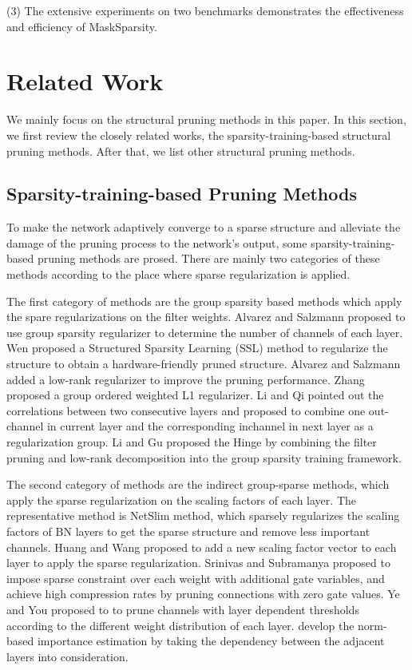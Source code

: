 \documentclass[review]{cvpr}
\begin{document}
(3)	The extensive experiments on two benchmarks demonstrates the effectiveness and efficiency of MaskSparsity.



\section{Related Work}
We mainly focus on the structural pruning methods in this paper.
In this section, we first review the closely related works, \ie the sparsity-training-based structural pruning methods. After that, we list other structural pruning methods.

\subsection{Sparsity-training-based Pruning Methods}
To make the network adaptively converge to a sparse structure and alleviate the damage of the pruning process to the network's output, some sparsity-training-based pruning methods are prosed. There are mainly two categories of these methods according to the place where sparse regularization is applied. 

The first category of methods are the group sparsity based methods which apply the spare regularizations on the filter weights. Alvarez and Salzmann \cite{alvarez2016learning} proposed to use group sparsity regularizer to determine the number of channels of each layer. Wen \etal \cite{wen2016learning} proposed a Structured Sparsity Learning (SSL) method to regularize the structure to obtain a hardware-friendly pruned structure.  Alvarez and Salzmann \cite{alvarez2017compression} added a low-rank regularizer to improve the pruning performance. Zhang \etal proposed a group ordered weighted L1 regularizer. Li and Qi \cite{OICSROS} pointed out the correlations between two consecutive layers and proposed to combine one out-channel in current layer and the corresponding inchannel in next layer as a regularization group. Li and Gu proposed the Hinge \cite{Hinge} by combining the filter pruning and low-rank decomposition into the group sparsity training framework.

 
The second category of methods are the indirect group-sparse methods, which apply the sparse regularization on the scaling factors of each layer. The representative method is NetSlim \cite{liu2017learning} method, which sparsely regularizes the scaling factors of BN layers to get the sparse structure and remove less important channels. Huang and Wang \cite{huang2018data} proposed to add a new scaling factor vector to each layer to apply the sparse regularization. Srinivas and Subramanya \cite{Srinivas2017TrainingSN} proposed to impose sparse constraint over each weight with additional gate variables, and achieve high compression rates by pruning connections with zero gate values. Ye and You \cite{OT} proposed to to prune channels with layer dependent thresholds according to the different weight distribution of each layer. \cite{Dependency} develop the norm-based importance estimation by taking the dependency between the adjacent layers into consideration.
 
\end{document}
